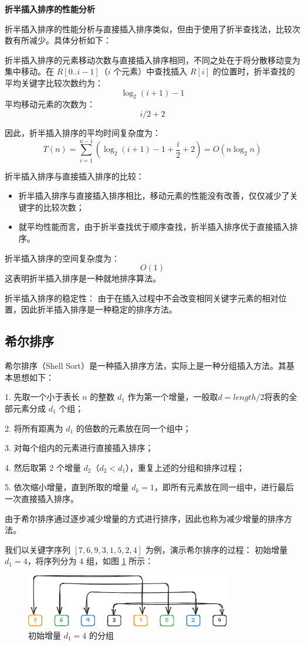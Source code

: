 \documentclass[lang=cn,newtx,10pt,scheme=chinese]{../elegantbook}
\begin{document}
\textbf{折半插入排序的性能分析}

折半插入排序的性能分析与直接插入排序类似，但由于使用了折半查找法，比较次数有所减少。具体分析如下：


折半插入排序的元素移动次数与直接插入排序相同，不同之处在于将分散移动变为集中移动。在 $R[0..i-1]$（$i$ 个元素）中查找插入 $R[i]$ 的位置时，折半查找的平均关键字比较次数约为：
\[
\log_2(i+1) - 1
\]
平均移动元素的次数为：
\[
i/2 + 2
\]

因此，折半插入排序的平均时间复杂度为：
\[
T(n) = \sum_{i=1}^{n-1} \left(\log_2(i+1) - 1 + \frac{i}{2} + 2\right) = O(n \log_2 n)
\]


折半插入排序与直接插入排序的比较：
\begin{itemize}
  \item 折半插入排序与直接插入排序相比，移动元素的性能没有改善，仅仅减少了关键字的比较次数；
  \item 就平均性能而言，由于折半查找优于顺序查找，折半插入排序优于直接插入排序。
\end{itemize}


折半插入排序的空间复杂度为：
\[
O(1)
\]
这表明折半插入排序是一种就地排序算法。

折半插入排序的稳定性：  
由于在插入过程中不会改变相同关键字元素的相对位置，因此折半插入排序是一种稳定的排序方法。

\subsection{希尔排序}
希尔排序（Shell Sort）是一种插入排序方法，实际上是一种分组插入方法。其基本思想如下：

1. 先取一个小于表长 $n$ 的整数 $d_1$ 作为第一个增量，一般取$d = length/2$将表的全部元素分成 $d_1$ 个组；

2. 将所有距离为 $d_1$ 的倍数的元素放在同一个组中；

3. 对每个组内的元素进行直接插入排序；

4. 然后取第 2 个增量 $d_2$（$d_2 < d_1$），重复上述的分组和排序过程；

5. 依次缩小增量，直到所取的增量 $d_k = 1$，即所有元素放在同一组中，进行最后一次直接插入排序。

由于希尔排序通过逐步减少增量的方式进行排序，因此也称为减少增量的排序方法。

我们以关键字序列 $[7,6,9,3,1,5,2,4]$ 为例，演示希尔排序的过程：
初始增量 $d_1 = 4$，将序列分为 4 组，如图 \ref{fig:shellSort1} 所示：
\begin{figure}[h!]
    \centering
    \includegraphics[width=0.8\textwidth]{./figure/pdf/cropped/shell(a).pdf}
    \caption{初始增量 $d_1 = 4$ 的分组}
    \label{fig:shellSort1}
\end{figure}
\end{document}
